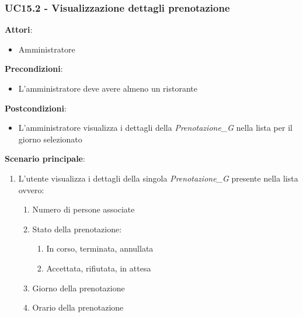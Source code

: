 \subsubsection{UC15.2 - Visualizzazione dettagli prenotazione}\label{usecase:15_2}
\textbf{Attori}:
\begin{itemize}
    \item Amministratore
\end{itemize}
\textbf{Precondizioni}:
\begin{itemize}
    \item L'amministratore deve avere almeno un ristorante
\end{itemize}
\textbf{Postcondizioni}:
\begin{itemize}
    \item L'amministratore visualizza i dettagli della \textit{Prenotazione_G} nella lista per il giorno selezionato
\end{itemize}
\textbf{Scenario principale}:
\begin{enumerate}
    \item L'utente visualizza i dettagli della singola \textit{Prenotazione_G} presente nella lista ovvero:
    \begin{enumerate}
        \item Numero di persone associate
        \item Stato della prenotazione:
         \begin{enumerate}
           \item In corso, terminata, annullata
            \item Accettata, rifiutata, in attesa
       \end{enumerate}
    \item Giorno della prenotazione
    \item Orario della prenotazione
    \end{enumerate}
\end{enumerate}
\newpage